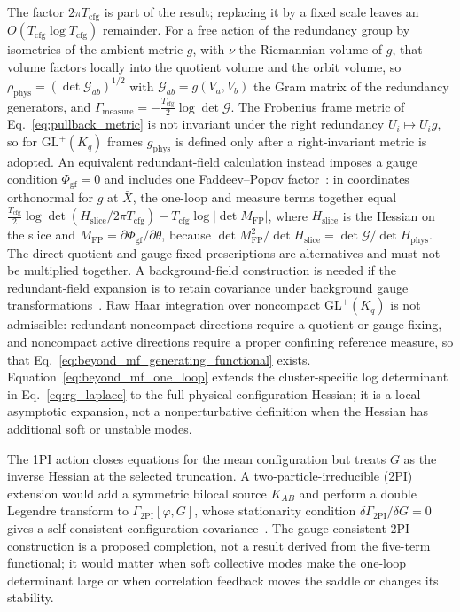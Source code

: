 \documentclass[11pt]{article}
\begin{document}
The factor $2\pi T_{\mathrm{cfg}}$ is part of the result; replacing it by a fixed scale leaves an $O(T_{\mathrm{cfg}}\log T_{\mathrm{cfg}})$ remainder. For a free action of the redundancy group by isometries of the ambient metric $g$, with $\nu$ the Riemannian volume of $g$, that volume factors locally into the quotient volume and the orbit volume, so $\rho_{\mathrm{phys}}=(\det\mathcal{G}_{ab})^{1/2}$ with $\mathcal{G}_{ab}=g(V_a,V_b)$ the Gram matrix of the redundancy generators, and $\Gamma_{\mathrm{measure}}=-\frac{T_{\mathrm{cfg}}}{2}\log\det\mathcal{G}$. The Frobenius frame metric of Eq.~\eqref{eq:pullback_metric} is not invariant under the right redundancy $U_i\mapsto U_ig$, so for $\mathrm{GL}^+(K_q)$ frames $g_{\mathrm{phys}}$ is defined only after a right-invariant metric is adopted. An equivalent redundant-field calculation instead imposes a gauge condition $\Phi_{\mathrm{gf}}=0$ and includes one Faddeev--Popov factor~\cite{FaddeevPopov1967}: in coordinates orthonormal for $g$ at $\bar{X}$, the one-loop and measure terms together equal $\frac{T_{\mathrm{cfg}}}{2}\log\det(H_{\mathrm{slice}}/2\pi T_{\mathrm{cfg}})-T_{\mathrm{cfg}}\log|\det M_{\mathrm{FP}}|$, where $H_{\mathrm{slice}}$ is the Hessian on the slice and $M_{\mathrm{FP}}=\partial\Phi_{\mathrm{gf}}/\partial\theta$, because $\det M_{\mathrm{FP}}^2/\det H_{\mathrm{slice}}=\det\mathcal{G}/\det H_{\mathrm{phys}}$. The direct-quotient and gauge-fixed prescriptions are alternatives and must not be multiplied together. A background-field construction is needed if the redundant-field expansion is to retain covariance under background gauge transformations~\cite{DeWitt1967,Abbott1981,Abbott1982}. Raw Haar integration over noncompact $\mathrm{GL}^+(K_q)$ is not admissible: redundant noncompact directions require a quotient or gauge fixing, and noncompact active directions require a proper confining reference measure, so that Eq.~\eqref{eq:beyond_mf_generating_functional} exists. Equation~\eqref{eq:beyond_mf_one_loop} extends the cluster-specific log determinant in Eq.~\eqref{eq:rg_laplace} to the full physical configuration Hessian; it is a local asymptotic expansion, not a nonperturbative definition when the Hessian has additional soft or unstable modes.

The 1PI action closes equations for the mean configuration but treats $G$ as the inverse Hessian at the selected truncation. A two-particle-irreducible (2PI) extension would add a symmetric bilocal source $K_{AB}$ and perform a double Legendre transform to $\Gamma_{\mathrm{2PI}}[\varphi,G]$, whose stationarity condition $\delta\Gamma_{\mathrm{2PI}}/\delta G=0$ gives a self-consistent configuration covariance~\cite{CornwallJackiwTomboulis1974}. The gauge-consistent 2PI construction is a proposed completion, not a result derived from the five-term functional; it would matter when soft collective modes make the one-loop determinant large or when correlation feedback moves the saddle or changes its stability.
\end{document}
